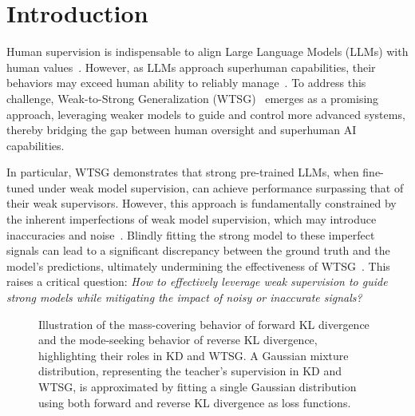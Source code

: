 \section{Introduction}

Human supervision is indispensable to align Large Language Models (LLMs) with human values~\citep{bai2022training,achiam2023gpt}.
However, as LLMs approach superhuman capabilities, their behaviors may exceed human ability to reliably manage~\citep{openai_superalignment}. 
To address this challenge, 
Weak-to-Strong Generalization (WTSG)~\citep{burns2023weak} emerges as a promising approach, leveraging weaker models to guide and control more advanced systems, thereby bridging the gap between human oversight and superhuman AI capabilities. 


In particular, WTSG demonstrates that strong pre-trained LLMs, when fine-tuned under weak model supervision, can achieve performance surpassing that of their weak supervisors. 
However, this approach is fundamentally constrained by the inherent imperfections of weak model supervision, which may introduce inaccuracies and noise~\citep{burns2023weak}. 
Blindly fitting the strong model to these imperfect signals can lead to a significant discrepancy between the ground truth and the model's predictions, ultimately undermining the effectiveness of WTSG~\citep{yao2025understanding}. 
This raises a critical question: \textit{How to effectively leverage weak supervision to guide strong models while mitigating the impact of noisy or inaccurate signals?}



\begin{figure*}[t]
\begin{center}
\caption{Illustration of the mass-covering behavior of forward KL divergence and the mode-seeking behavior of reverse KL divergence, highlighting their roles in KD and WTSG. A Gaussian mixture distribution, representing the teacher's supervision in KD and WTSG, is approximated by fitting a single Gaussian distribution using both forward and reverse KL divergence as loss functions.}
\label{fig:comparison_kl}
\end{center}
\vspace{-5pt}
\end{figure*}


